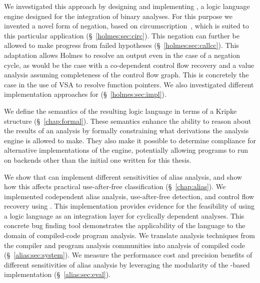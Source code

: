 We investigated this approach by designing and implementing \sysname, a logic language engine designed for the integration of binary analyses.
For this purpose we invented a novel form of negation, based on circumscription~\cite{circumscription}, which is suited to this particular application (\S~\ref{holmes:sec:circ}).
This negation can further be allowed to make progress from failed hypotheses (\S~\ref{holmes:sec:callcc}).
This adaptation allows Holmes to resolve an output even in the case of a negation cycle, as would be the case with a co-dependent control flow recovery and a value analysis assuming completeness of the control flow graph.
This is concretely the case in the use of VSA to resolve function pointers.
We also investigated different implementation approaches for \sysname (\S~\ref{holmes:sec:impl}).

We define the semantics of the resulting logic language in terms of a Kripke structure (\S~\ref{chap:formal}).
These semantics enhance the ability to reason about the results of an analysis by formally constraining what derivations the analysis engine is allowed to make.
They also make it possible to determine compliance for alternative implementations of the engine, potentially allowing programs to run on backends other than the initial one written for this thesis.

We show that \sysname can implement different sensitivities of alias analysis, and show how this affects practical use-after-free classification (\S~\ref{chap:alias}).
We implemented codependent alias analysis, use-after-free detection, and control flow recovery using \sysname.
This implementation provides evidence for the feasibility of using a logic language as an integration layer for cyclically dependent analyses.
This concrete bug finding tool demonstrates the applicability of the \sysname language to the domain of compiled-code program analysis.
We translate analysis techniques from the compiler and program analysis communities into analysis of compiled code (\S~\ref{alias:sec:system}).
We measure the performance cost and precision benefits of different sensitivities of alias analysis by leveraging the modularity of the \sysname-based implementation (\S~\ref{alias:sec:eval}).

